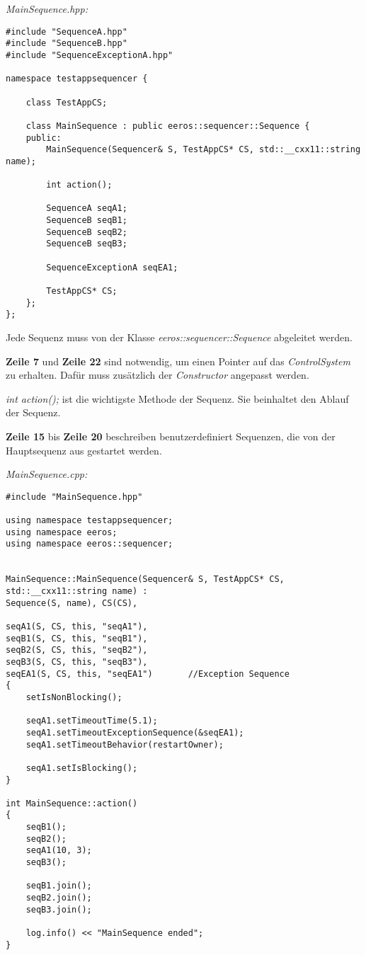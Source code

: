 \textit{MainSequence.hpp:}\
\begin{lstlisting}
#include "SequenceA.hpp"
#include "SequenceB.hpp"
#include "SequenceExceptionA.hpp"

namespace testappsequencer {

	class TestAppCS;
	
	class MainSequence : public eeros::sequencer::Sequence {
	public:
		MainSequence(Sequencer& S, TestAppCS* CS, std::__cxx11::string name);

		int action();
		
		SequenceA seqA1;
		SequenceB seqB1; 
		SequenceB seqB2; 
		SequenceB seqB3;
		
		SequenceExceptionA seqEA1;
		
		TestAppCS* CS;
	};
};
\end{lstlisting}

Jede Sequenz muss von der Klasse \textit{eeros::sequencer::Sequence} abgeleitet werden.

\textbf{Zeile 7} und \textbf{Zeile 22} sind notwendig, um einen Pointer auf das \textit{ControlSystem} zu erhalten.
Dafür muss zusätzlich der \textit{Constructor} angepasst werden.

\textit{int action();} ist die wichtigste Methode der Sequenz.
Sie beinhaltet den Ablauf der Sequenz.

\textbf{Zeile 15} bis \textbf{Zeile 20} beschreiben benutzerdefiniert Sequenzen, die von der Hauptsequenz aus gestartet werden.


\textit{MainSequence.cpp:}\
\begin{lstlisting}
#include "MainSequence.hpp"

using namespace testappsequencer;
using namespace eeros;
using namespace eeros::sequencer;


MainSequence::MainSequence(Sequencer& S, TestAppCS* CS, std::__cxx11::string name) :
Sequence(S, name), CS(CS),

seqA1(S, CS, this, "seqA1"),
seqB1(S, CS, this, "seqB1"),
seqB2(S, CS, this, "seqB2"),
seqB3(S, CS, this, "seqB3"),
seqEA1(S, CS, this, "seqEA1")		//Exception Sequence
{
	setIsNonBlocking();
	
	seqA1.setTimeoutTime(5.1);
	seqA1.setTimeoutExceptionSequence(&seqEA1);
	seqA1.setTimeoutBehavior(restartOwner);
	
	seqA1.setIsBlocking();
}

int MainSequence::action()
{
	seqB1();
	seqB2();
	seqA1(10, 3);
	seqB3();
	
	seqB1.join();
	seqB2.join();
	seqB3.join();
	
	log.info() << "MainSequence ended";
}
\end{lstlisting}

